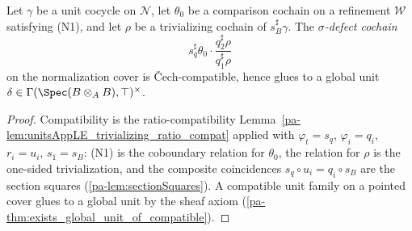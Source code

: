 \begin{theorem}
  \label{pa-thm:exists_glued_sigmaDefect}
  \leanok

  Let \(\gamma\) be a unit cocycle on \(\mathcal N\), let \(\theta_0\) be a comparison cochain on
  a refinement \(\mathcal W\) satisfying (N1), and let \(\rho\) be a trivializing cochain of
  \(s_B^{\sharp}\gamma\). The \emph{\(\sigma\)-defect cochain}
  \[
    s_q^{\sharp}\theta_0 \cdot \frac{q_2^{\sharp}\rho}{q_1^{\sharp}\rho}
  \]
  on the normalization cover is \v Cech-compatible, hence glues to a global unit \(\delta \in
  \Gamma(\Spec(B \otimes_A B), \top)^{\times}\).
\end{theorem}
\begin{proof}
  \leanok
  Compatibility is the ratio-compatibility Lemma~\ref{pa-lem:unitsAppLE_trivializing_ratio_compat}
  applied with \(\varphi_t = s_q\), \(\varphi_i = q_i\), \(r_i = u_i\), \(s_1 = s_B\): (N1) is
  the coboundary relation for \(\theta_0\), the relation for \(\rho\) is the one-sided
  trivialization, and the composite coincidences \(s_q \circ u_i = q_i \circ s_B\) are the
  section squares (\ref{pa-lem:sectionSquares}). A compatible unit family on a pointed cover glues to
  a global unit by the sheaf axiom (\ref{pa-thm:exists_global_unit_of_compatible}).
\end{proof}

